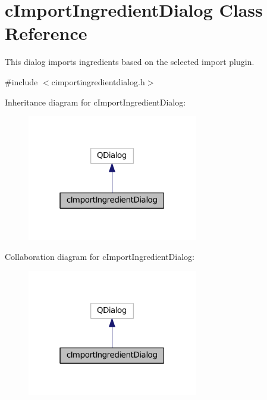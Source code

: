 \hypertarget{classc_import_ingredient_dialog}{}\section{c\+Import\+Ingredient\+Dialog Class Reference}
\label{classc_import_ingredient_dialog}


This dialog imports ingredients based on the selected import plugin.  




{\ttfamily \#include $<$cimportingredientdialog.\+h$>$}



Inheritance diagram for c\+Import\+Ingredient\+Dialog\+:
\nopagebreak
\begin{figure}[H]
\begin{center}
\leavevmode
\includegraphics[width=211pt]{classc_import_ingredient_dialog__inherit__graph}
\end{center}
\end{figure}


Collaboration diagram for c\+Import\+Ingredient\+Dialog\+:
\nopagebreak
\begin{figure}[H]
\begin{center}
\leavevmode
\includegraphics[width=211pt]{classc_import_ingredient_dialog__coll__graph}
\end{center}
\end{figure}
